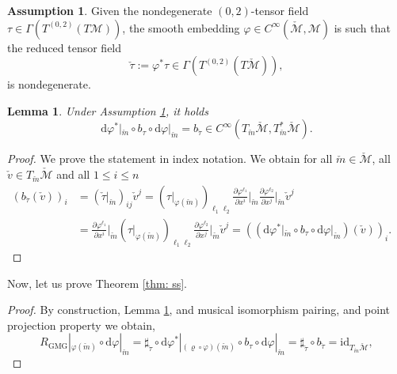 \documentclass{article}
\theoremstyle{plain}
\newtheorem{lemma}[theorem]{Lemma}
\theoremstyle{definition}
\newtheorem{assumption}[theorem]{Assumption}
\theoremstyle{remark}
\begin{document}
\begin{assumption}
\label{assumption_necessary}
Given the nondegenerate $(0,2)$-tensor field $\tau \in \Gamma(T^{(0,2)}(T\mathcal{M}))$, the smooth embedding $\varphi \in C^{\infty}(\check{\mathcal{M}}, \mathcal{M})$ is such that the reduced tensor field
\begin{equation*}
\check{\tau} := \varphi^*\tau \in \Gamma(T^{(0,2)}(T\check{\mathcal{M}})),
\end{equation*}
is nondegenerate.
\end{assumption}

\begin{lemma}
\label{lemmaa}
Under Assumption \ref{assumption_necessary}, it holds
\begin{equation}
\mathrm{d}\varphi^*|_{\check{m}} \circ b_\tau \circ \mathrm{d}\varphi|_{\check{m}} = b_{\check{\tau}} \in C^{\infty}(T_{\check{m}}\check{\mathcal{M}}, T_{\check{m}}^*\check{\mathcal{M}}). 
\end{equation}
\end{lemma}

\begin{proof}
     We prove the statement in index notation. We obtain for all $\check{m} \in \check{\mathcal{M}}$, all $\check{v} \in T_{\check{m}}\check{\mathcal{M}}$ and all $1 \leq i \leq n$
\begin{align}
(b_{\check{\tau}}(\check{v}))_i &= (\check{\tau}|_{\check{m}})_{ij} \check{v}^j = (\tau|_{\varphi(\check{m})})_{\ell_1 \ell_2} \frac{\partial\varphi^{\ell_1}}{\partial x^i}\bigg|_{\check{m}} \frac{\partial\varphi^{\ell_2}}{\partial x^j}\bigg|_{\check{m}} \check{v}^j \\
&= \frac{\partial\varphi^{\ell_1}}{\partial x^i}\bigg|_{\check{m}} (\tau|_{\varphi(\check{m})})_{\ell_1 \ell_2} \frac{\partial\varphi^{\ell_2}}{\partial x^j}\bigg|_{\check{m}} \check{v}^j = \left((\mathrm{d}\varphi^*|_{\check{m}} \circ b_\tau \circ \mathrm{d}\varphi|_{\check{m}})(\check{v})\right)_i. \quad
\end{align}
\end{proof}

Now, let us prove Theorem \ref{thm: ss}.

\begin{proof}
    By construction, Lemma \ref{lemmaa}, and musical isomorphism pairing, and point projection property we obtain,
\begin{equation*}
R_{\text{GMG}}|_{\varphi(\check{m})} \circ \mathrm{d}\varphi|_{\check{m}} = \sharp_{\check{\tau}} \circ \mathrm{d}\varphi^*|_{(\varrho \circ \varphi)(\check{m})} \circ b_\tau \circ \mathrm{d}\varphi|_{\check{m}} = \sharp_{\check{\tau}} \circ b_{\check{\tau}} = \mathrm{id}_{T_{\check{m}}\check{\mathcal{M}}},
\end{equation*}
\end{proof}
\end{document}
